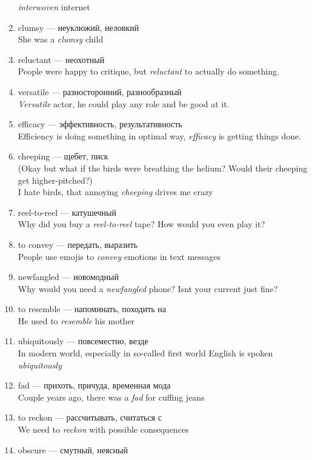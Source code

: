 \documentclass[
]{article}
\begin{document}
\begin{enumerate}
  \emph{interwoven} internet
\item
  clumsy --- неуклюжий, неловкий\\
  She was a \emph{clumsy} child
\item
  reluctant --- неохотный\\
  People were happy to critique, but \emph{reluctant} to actually do
  something.
\item
  versatile --- разносторонний, разнообразный\\
  \emph{Versatile} actor, he could play any role and be good at it.
\item
  efficacy --- эффективность, результативность\\
  Efficiency is doing something in optimal way, \emph{efficacy} is
  getting things done.
\item
  cheeping --- щебет, писк\\
  (Okay but what if the birds were breathing the helium? Would their
  cheeping get higher-pitched?)\\
  I hate birds, that annoying \emph{cheeping} drives me crazy
\item
  reel-to-reel --- катушечный\\
  Why did you buy a \emph{reel-to-reel} tape? How would you even play
  it?
\item
  to convey --- передать, выразить\\
  People use emojis to \emph{convey} emotions in text messages
\item
  newfangled --- новомодный\\
  Why would you need a \emph{newfangled} phone? Isn\textquotesingle t
  your current just fine?
\item
  to resemble --- напоминать, походить на\\
  He used to \emph{resemble} his mother
\item
  ubiquitously --- повсеместно, везде\\
  In modern world, especially in so-called \textquotesingle first
  world\textquotesingle{} English is spoken \emph{ubiquitously}
\item
  fad --- прихоть, причуда, временная мода\\
  Couple years ago, there was a \emph{fad} for cuffing jeans
\item
  to reckon --- рассчитывать, считаться с\\
  We need to \emph{reckon} with possible consequences
\item
  obscure --- смутный, неясный\\

\end{enumerate}
\end{document}
